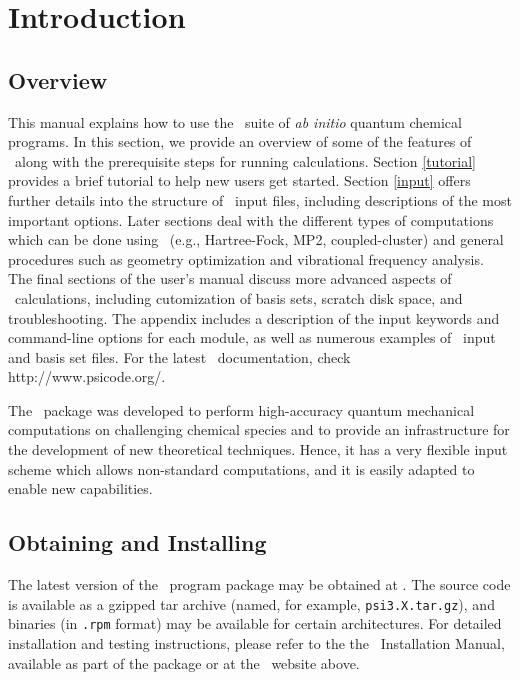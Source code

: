 \section{Introduction} \label{introduction}

\subsection{Overview}
This manual explains how to use the
\PSIthree\ suite of {\em ab initio} quantum chemical programs.  
In this section, we provide an overview of some
of the features of \PSIthree\ along with the prerequisite steps for
running calculations.  Section \ref{tutorial} provides a brief
tutorial to help new users get started.  Section \ref{input} offers
further details into the structure of \PSIthree\ input files,
including descriptions of the most important options.
Later sections deal with the different types of computations which
can be done using \PSIthree\ (e.g., Hartree-Fock, MP2, coupled-cluster)
and general procedures such as geometry optimization
and vibrational frequency analysis.  The final sections of the user's manual 
discuss more advanced aspects of \PSIthree\
calculations, including cutomization of basis sets, scratch disk
space, and troubleshooting.  The appendix includes a description of
the input keywords and command-line options for each module, as well
as numerous examples of \PSIthree\ input and basis set files.
For the latest \PSIthree\ documentation, check 
{http://www.psicode.org/}.

The \PSIthree\ package was developed to perform high-accuracy 
quantum mechanical computations on challenging chemical species
and to provide an infrastructure for the development of new
theoretical techniques.  Hence, it has a very flexible input
scheme which allows non-standard computations, and it is easily
adapted to enable new capabilities.

\subsection{Obtaining and Installing \PSIthree}
\label{installation}

The latest version of the \PSIthree\ program package may be obtained
at \htmladdnormallink{{\tt www.psicode.org}}{http://www.psicode.org}.
The source code is available as a gzipped tar archive (named, for
example, {\tt psi3.X.tar.gz}), and binaries (in {\tt .rpm} format) may
be available for certain architectures.  For detailed installation and
testing instructions, please refer to the the \PSIthree\
Installation Manual, available as part of the package or at the
\PSIthree\ website above.

